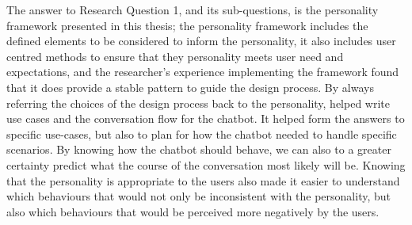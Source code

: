 The answer to Research Question 1, and its sub-questions, is the personality framework presented in this thesis; the personality framework includes the defined elements to be considered to inform the personality, it also includes user centred methods to ensure that they personality meets user need and expectations, and the researcher's experience implementing the framework found that it does provide a stable pattern to guide the design process. By always referring the choices of the design process back to the personality, helped write use cases and the conversation flow for the chatbot. It helped form the answers to specific use-cases, but also to plan for how the chatbot needed to handle specific scenarios. By knowing how the chatbot should behave, we can also to a greater certainty predict what the course of the conversation most likely will be. Knowing that the personality is appropriate to the users also made it easier to understand which behaviours that would not only be inconsistent with the personality, but also which behaviours that would be perceived more negatively by the users.

